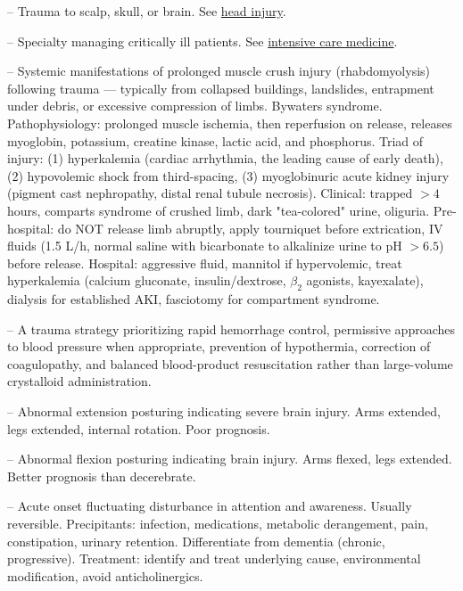 -- Trauma to scalp, skull, or brain. See \hyperlink{Head Injury}{head injury}.

-- Specialty managing critically ill patients. See \hyperlink{Intensive Care Medicine}{intensive care medicine}.

-- Systemic manifestations of prolonged muscle crush injury (rhabdomyolysis) following trauma — typically from collapsed buildings, landslides, entrapment under debris, or excessive compression of limbs. Bywaters syndrome. Pathophysiology: prolonged muscle ischemia, then reperfusion on release, releases myoglobin, potassium, creatine kinase, lactic acid, and phosphorus. Triad of injury: (1) hyperkalemia (cardiac arrhythmia, the leading cause of early death), (2) hypovolemic shock from third-spacing, (3) myoglobinuric acute kidney injury (pigment cast nephropathy, distal renal tubule necrosis). Clinical: trapped $> 4$ hours, comparts syndrome of crushed limb, dark "tea-colored" urine, oliguria. Pre-hospital: do NOT release limb abruptly, apply tourniquet before extrication, IV fluids (1.5 L/h, normal saline with bicarbonate to alkalinize urine to pH $> 6.5$) before release. Hospital: aggressive fluid, mannitol if hypervolemic, treat hyperkalemia (calcium gluconate, insulin/dextrose, $\beta_2$ agonists, kayexalate), dialysis for established AKI, fasciotomy for compartment syndrome.

-- A trauma strategy prioritizing rapid hemorrhage control, permissive approaches to blood pressure when appropriate, prevention of hypothermia, correction of coagulopathy, and balanced blood-product resuscitation rather than large-volume crystalloid administration.

-- Abnormal extension posturing indicating severe brain injury. Arms extended, legs extended, internal rotation. Poor prognosis.

-- Abnormal flexion posturing indicating brain injury. Arms flexed, legs extended. Better prognosis than decerebrate.

-- Acute onset fluctuating disturbance in attention and awareness. Usually reversible. Precipitants: infection, medications, metabolic derangement, pain, constipation, urinary retention. Differentiate from dementia (chronic, progressive). Treatment: identify and treat underlying cause, environmental modification, avoid anticholinergics.

